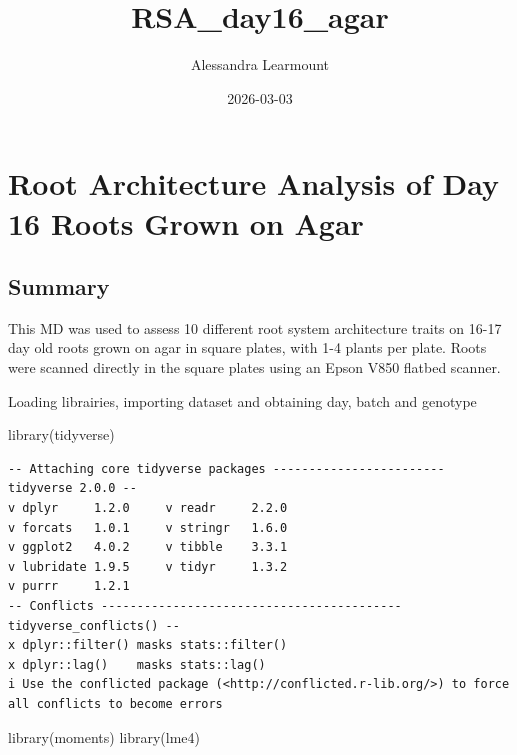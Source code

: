 \documentclass[
  letterpaper,
  DIV=11,
  numbers=noendperiod]{scrartcl}
\title{RSA\_day16\_agar}
\author{Alessandra Learmount}
\date{2026-03-03}
\newenvironment{Shaded}{\begin{snugshade}}{\end{snugshade}}
\newcommand{\FunctionTok}[1]{\textcolor[rgb]{0.28,0.35,0.67}{#1}}
\newcommand{\NormalTok}[1]{\textcolor[rgb]{0.00,0.23,0.31}{#1}}
\renewcommand*\contentsname{Table of contents}
\newcommand\contentsname{Table of contents}
\begin{document}
\maketitle

\renewcommand*\contentsname{Table of contents}
{
\setcounter{tocdepth}{3}
\tableofcontents
}

\section{Root Architecture Analysis of Day 16 Roots Grown on
Agar}\label{root-architecture-analysis-of-day-16-roots-grown-on-agar}

\subsection{Summary}\label{summary}

This MD was used to assess 10 different root system architecture traits
on 16-17 day old roots grown on agar in square plates, with 1-4 plants
per plate. Roots were scanned directly in the square plates using an
Epson V850 flatbed scanner.

Loading librairies, importing dataset and obtaining day, batch and
genotype

\begin{Shaded}
\begin{Highlighting}[]
\FunctionTok{library}\NormalTok{(tidyverse)}
\end{Highlighting}
\end{Shaded}

\begin{verbatim}
-- Attaching core tidyverse packages ------------------------ tidyverse 2.0.0 --
v dplyr     1.2.0     v readr     2.2.0
v forcats   1.0.1     v stringr   1.6.0
v ggplot2   4.0.2     v tibble    3.3.1
v lubridate 1.9.5     v tidyr     1.3.2
v purrr     1.2.1     
-- Conflicts ------------------------------------------ tidyverse_conflicts() --
x dplyr::filter() masks stats::filter()
x dplyr::lag()    masks stats::lag()
i Use the conflicted package (<http://conflicted.r-lib.org/>) to force all conflicts to become errors
\end{verbatim}

\begin{Shaded}
\begin{Highlighting}[]
\FunctionTok{library}\NormalTok{(moments)}
\FunctionTok{library}\NormalTok{(lme4)}
\end{Highlighting}
\end{Shaded}
\end{document}
